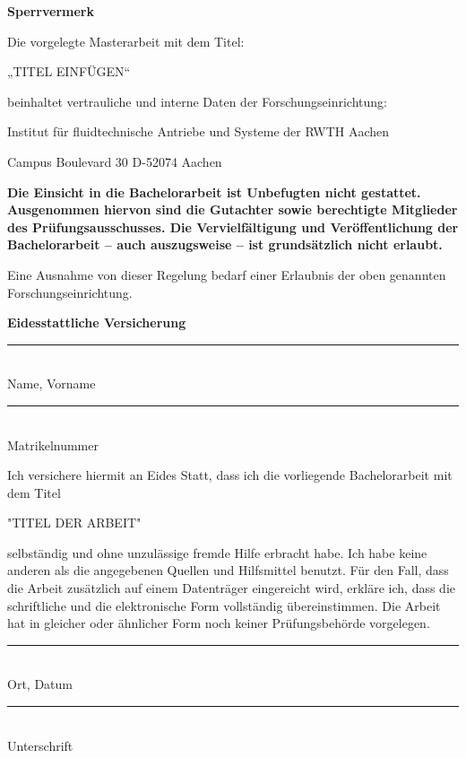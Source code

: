 \begin{center}
	\textbf{Sperrvermerk}
\end{center}
\raggedright
Die vorgelegte Masterarbeit mit dem Titel:

„TITEL EINFÜGEN“

beinhaltet vertrauliche und interne Daten der Forschungseinrichtung:

Institut für fluidtechnische Antriebe und Systeme der RWTH Aachen

Campus Boulevard 30 D-52074 Aachen

\textbf{Die Einsicht in die Bachelorarbeit ist Unbefugten nicht gestattet. Ausgenommen hiervon sind die Gutachter sowie berechtigte Mitglieder des Prüfungsausschusses. Die Vervielfältigung und Veröffentlichung der Bachelorarbeit – auch auszugsweise – ist grundsätzlich nicht erlaubt.}

Eine Ausnahme von dieser Regelung bedarf einer Erlaubnis der oben genannten Forschungseinrichtung.

\clearpage


\begin{center}
	\textbf{Eidesstattliche Versicherung}
\end{center}
\vspace{2cm}

\parbox{7cm}{\rule{7cm}{1pt}\\Name, Vorname}
\hfill 
\parbox{7cm}{\rule{7cm}{1pt}\\Matrikelnummer}
\vspace{1cm}

Ich versichere hiermit an Eides Statt, dass ich die vorliegende Bachelorarbeit mit dem Titel

"TITEL DER ARBEIT"

selbständig und ohne unzulässige fremde Hilfe erbracht habe. Ich habe keine anderen als
die angegebenen Quellen und Hilfsmittel benutzt. Für den Fall, dass die Arbeit zusätzlich auf
einem Datenträger eingereicht wird, erkläre ich, dass die schriftliche und die elektronische
Form vollständig übereinstimmen. Die Arbeit hat in gleicher oder ähnlicher Form noch keiner
Prüfungsbehörde vorgelegen.

\vspace{2cm}
\parbox{7cm}{\rule{7cm}{1pt}\\Ort, Datum}
\hfill 
\parbox{7cm}{\rule{7cm}{1pt}\\Unterschrift}
\clearpage